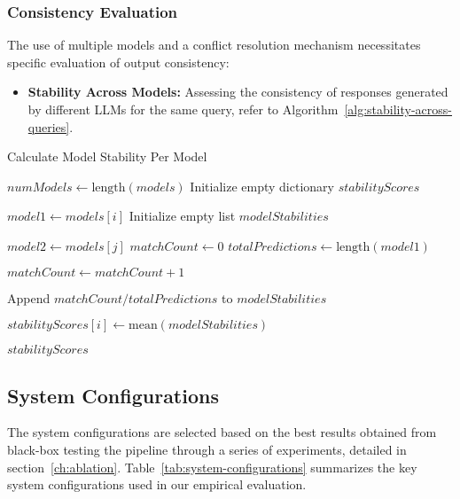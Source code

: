 \subsubsection{Consistency Evaluation}
The use of multiple models and a conflict resolution mechanism necessitates specific evaluation of output consistency:

\begin{itemize}
    \item \textbf{Stability Across Models:} Assessing the consistency of responses generated by different LLMs for the same query, refer to Algorithm~\ref{alg:stability-across-queries}.
\end{itemize}
\begin{algorithm}
    \caption{Calculate Model Stability Per Model}
    \begin{algorithmic}[1]
         
            \State $numModels \gets \text{length}(models)$
            \State Initialize empty dictionary $stabilityScores$

                \State $model1 \gets models[i]$
                \State Initialize empty list $modelStabilities$

                        \State $model2 \gets models[j]$
                        \State $matchCount \gets 0$
                        \State $totalPredictions \gets \text{length}(model1)$

                                \State $matchCount \gets matchCount + 1$
                            \EndIf
                        \EndFor

                        \State Append $matchCount / totalPredictions$ to $modelStabilities$
                    \EndIf
                \EndFor

                \State $stabilityScores[i] \gets \text{mean}(modelStabilities)$
            \EndFor

            \State \Return $stabilityScores$ 
        \EndProcedure
    \end{algorithmic}\label{alg:stability-across-queries}
\end{algorithm}

\subsection{System Configurations}\label{subsec:empirical-evaluation:experimental-setup:system-configurations}
The system configurations are selected based on the best results obtained from black-box testing the pipeline through a series of experiments, detailed in section~\ref{ch:ablation}.
Table~\ref{tab:system-configurations} summarizes the key system configurations used in our empirical evaluation.

